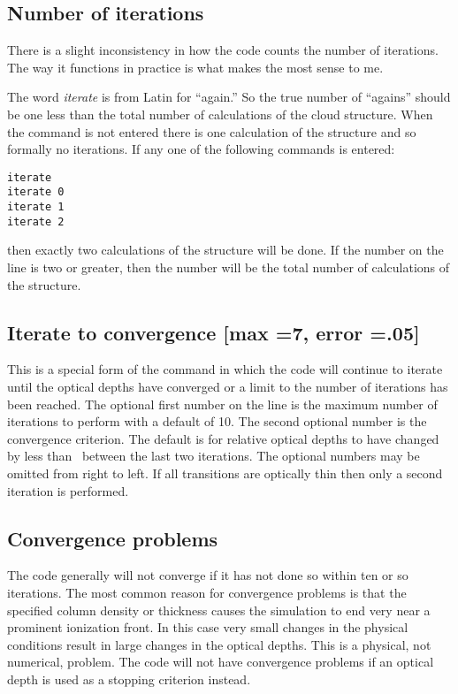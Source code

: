 \subsection{Number of iterations}

There is a slight inconsistency in how the code counts the number of
iterations.
The way it functions in practice is what makes the most sense
to me.

The word \emph{iterate} is from Latin for ``again.''
So the true number of
``agains'' should be one less than the total number of calculations of the
cloud structure.
When the  command is not entered there is one
calculation of the structure and so formally no iterations.
 If any one
of the following commands is entered:
\begin{verbatim}
iterate
iterate 0
iterate 1
iterate 2
\end{verbatim}
then exactly two calculations of the structure will be done.
If the number
on the line is two or greater, then the number will be the total number
of calculations of the structure.

\subsection{Iterate to convergence [max =7, error =.05] }

This is a special form of the  command
in which the code will
continue to iterate until the optical depths have converged or a limit to
the number of iterations has been reached.
The optional first number on
the line is the maximum number of iterations to perform with a default of
10.  The second optional number is the convergence criterion.
The default
is for relative optical depths to have changed by less than \autocv\ between
the last two iterations.
The optional numbers may be omitted from right
to left.
If all transitions are optically thin then only a second iteration
is performed.

\subsection{Convergence problems  }

The code generally will not converge if it has not done so within ten
or so iterations.
The most common reason for convergence problems is that
the specified column density or thickness causes the simulation to end
very near a prominent ionization front.
In this case very small changes in the
physical conditions result in large changes in the optical depths.  This
is a physical, not numerical, problem.
The code will not have convergence
problems if an optical depth is used as a stopping criterion instead.

